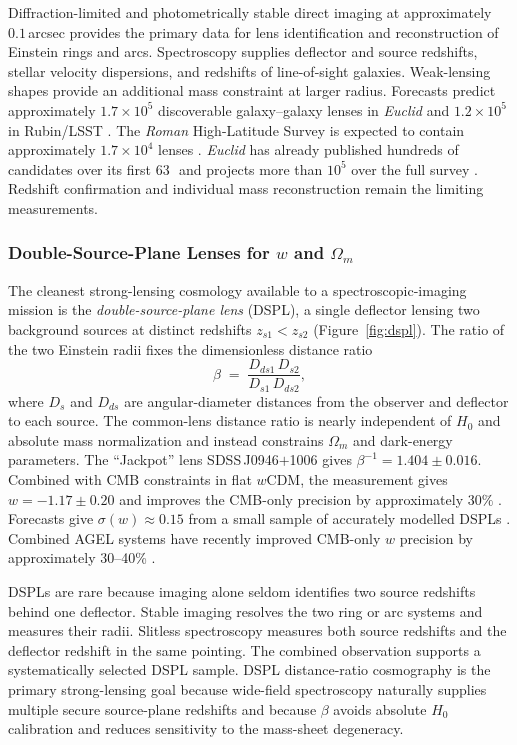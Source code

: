Diffraction-limited and photometrically stable direct imaging at approximately $0.1$\,arcsec provides the primary data for lens identification and reconstruction of Einstein rings and arcs. Spectroscopy supplies deflector and source redshifts, stellar velocity dispersions, and redshifts of line-of-sight galaxies. Weak-lensing shapes provide an additional mass constraint at larger radius. Forecasts predict approximately $1.7\times10^5$ discoverable galaxy--galaxy lenses in \textit{Euclid} and $1.2\times10^5$ in Rubin/LSST \cite{collett2015}. The \textit{Roman} High-Latitude Survey is expected to contain approximately $1.7\times10^4$ lenses \cite{weiner2020}. \textit{Euclid} has already published hundreds of candidates over its first 63\,\degti\ and projects more than $10^5$ over the full survey \cite{walmsley2025}. Redshift confirmation \cite{shu2025} and individual mass reconstruction remain the limiting measurements.

\subsubsection{Double-Source-Plane Lenses for \texorpdfstring{$w$}{w} and \texorpdfstring{$\Omega_m$}{Omega_m}}

The cleanest strong-lensing cosmology available to a spectroscopic-imaging mission is the \emph{double-source-plane lens} (DSPL), a single deflector lensing two background sources at distinct redshifts $z_{s1}<z_{s2}$ (Figure~\ref{fig:dspl}). The ratio of the two Einstein radii fixes the dimensionless distance ratio
\begin{equation}
\beta \;=\; \frac{D_{ds1}\,D_{s2}}{D_{s1}\,D_{ds2}},
\label{eq:dsplbeta}
\end{equation}
where $D_{s}$ and $D_{ds}$ are angular-diameter distances from the observer and deflector to each source. The common-lens distance ratio is nearly independent of $H_0$ and absolute mass normalization and instead constrains $\Omega_m$ and dark-energy parameters. The ``Jackpot'' lens SDSS\,J0946$+$1006 gives $\beta^{-1}=1.404\pm0.016$. Combined with CMB constraints in flat $w$CDM, the measurement gives $w=-1.17\pm0.20$ and improves the CMB-only precision by approximately $30\%$ \cite{collettauger2014}. Forecasts give $\sigma(w)\approx0.15$ from a small sample of accurately modelled DSPLs \cite{collett2012}. Combined AGEL systems have recently improved CMB-only $w$ precision by approximately $30$--40\% \cite{sahu2025,bowden2025}.

DSPLs are rare because imaging alone seldom identifies two source redshifts behind one deflector. Stable imaging resolves the two ring or arc systems and measures their radii. Slitless spectroscopy measures both source redshifts and the deflector redshift in the same pointing. The combined observation supports a systematically selected DSPL sample. DSPL distance-ratio cosmography is the primary strong-lensing goal because wide-field spectroscopy naturally supplies multiple secure source-plane redshifts and because $\beta$ avoids absolute $H_0$ calibration and reduces sensitivity to the mass-sheet degeneracy.

